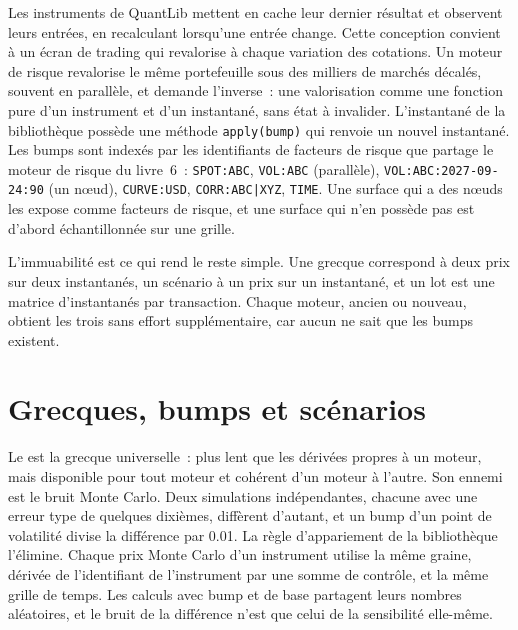 Les instruments de QuantLib mettent en cache leur dernier résultat et observent leurs entrées, en recalculant lorsqu'une entrée change. Cette conception convient à un écran de trading qui
revalorise à chaque variation des cotations. Un moteur de risque revalorise le même portefeuille sous des milliers de marchés décalés, souvent en parallèle, et demande l'inverse~: une valorisation comme
une fonction pure d'un instrument et d'un instantané, sans état à invalider. L'instantané de la bibliothèque possède une méthode \texttt{apply(bump)} qui renvoie un nouvel
instantané. Les bumps sont indexés par les identifiants de facteurs de risque que partage le moteur de risque du livre~6~: \texttt{SPOT:ABC}, \texttt{VOL:ABC} (parallèle),
\texttt{VOL:ABC:2027-09-24:90} (un nœud), \texttt{CURVE:USD}, \texttt{CORR:ABC|XYZ}, \texttt{TIME}. Une surface qui a des nœuds les expose comme facteurs de risque,
et une surface qui n'en possède pas est d'abord échantillonnée sur une grille.

L'immuabilité est ce qui rend le reste simple. Une grecque correspond à deux prix sur deux instantanés, un scénario à un prix sur un instantané, et un lot est une matrice
d'instantanés par transaction. Chaque moteur, ancien ou nouveau, obtient les trois sans effort supplémentaire, car aucun ne sait que les bumps existent.

\section{Grecques, bumps et scénarios}

Le  est la grecque universelle~: plus lent que les dérivées propres à un moteur, mais disponible pour tout moteur et cohérent d'un moteur à l'autre. Son ennemi
est le bruit Monte Carlo. Deux simulations indépendantes, chacune avec une erreur type de quelques dixièmes, diffèrent d'autant, et un bump d'un point de volatilité divise
la différence par 0.01. La règle d'appariement de la bibliothèque l'élimine. Chaque prix Monte Carlo d'un instrument utilise la même graine, dérivée
de l'identifiant de l'instrument par une somme de contrôle, et la même grille de temps. Les calculs avec bump et de base partagent leurs nombres aléatoires, et le bruit de la différence n'est
que celui de la sensibilité elle-même.


